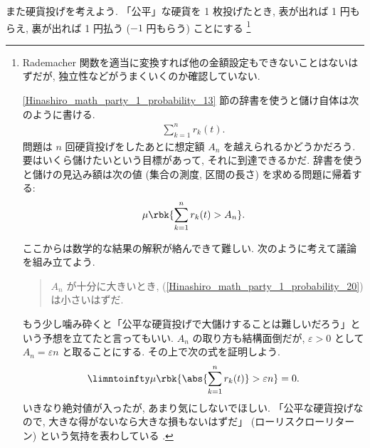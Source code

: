 \documentclass[openany, a4paper, oneside]{jsbook}
\begin{document}
また硬貨投げを考えよう.
「公平」な硬貨を 1 枚投げたとき, 表が出れば 1 円もらえ, 裏が出れば 1 円払う ($-1$ 円もらう) ことにする \footnote{Rademacher 関数を適当に変換すれば他の金額設定もできないことはないはずだが, 独立性などがうまくいくのか確認していない.

\ref{Hinashiro_math_party_1_probability_13} 節の辞書を使うと儲け自体は次のように書ける.
\begin{align}
 \sum_{k=1}^n r_k (t).
\end{align}
問題は $n$ 回硬貨投げをしたあとに想定額 $A_n$ を越えられるかどうかだろう.
要はいくら儲けたいという目標があって, それに到達できるかだ.
辞書を使うと儲けの見込み額は次の値 (集合の測度, 区間の長さ) を求める問題に帰着する:
\begin{align}
 \mu \rbk{\sum_{k=1}^n r_k (t) > A_n}. \label{Hinashiro_math_party_1_probability_20}
\end{align}

ここからは数学的な結果の解釈が絡んできて難しい.
次のように考えて議論を組み立てよう.
\begin{quote}
$A_n$ が十分に大きいとき, (\ref{Hinashiro_math_party_1_probability_20}) は小さいはずだ.
\end{quote}
もう少し噛み砕くと「公平な硬貨投げで大儲けすることは難しいだろう」という予想を立てたと言ってもいい.
$A_n$ の取り方も結構面倒だが, $\varepsilon > 0$ として $A_n = \varepsilon n$ と取ることにする.
その上で次の式を証明しよう.
\begin{align}
 \limntoinfty \mu \rbk{\abs{\sum_{k=1}^n r_k (t)} > \varepsilon n} = 0. \label{Hinashiro_math_party_1_probability_8}
\end{align}
いきなり絶対値が入ったが, あまり気にしないでほしい.
「公平な硬貨投げなので, 大きな得がないなら大きな損もないはずだ」 (ローリスクローリターン) という気持を表わしている \footnotemark.}
\end{document}
